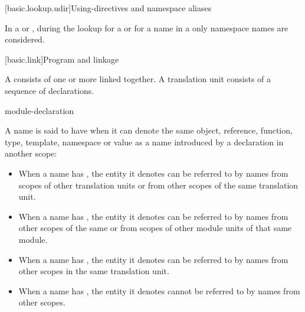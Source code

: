 [basic.lookup.udir]{Using-directives and namespace aliases}

\pnum
{}%
%
In a  or ,
during the lookup for a  or for a name in a
only namespace names are considered.%
%

[basic.link]{Program and linkage}%

\pnum
{}%
A  consists of one or more 
linked together. A translation unit consists
of a sequence of declarations.

\begin{bnf}
\br
    \br
     module-declaration  
\end{bnf}

\pnum
{}%
A name is said to have  when it can denote the same
object, reference, function, type, template, namespace or value as a
name introduced by a declaration in another scope:
\begin{itemize}
\item When a name has ,
the entity it denotes
can be referred to by names from scopes of other translation units or
from other scopes of the same translation unit.

\item When a name has ,
the entity it denotes
can be referred to by names from other scopes of the same  or
from scopes of other module units of that same module.

\item When a name has ,
the entity it denotes
can be referred to by names from other scopes in the same translation
unit.

\item When a name has , the entity it denotes
cannot be referred to by names from other scopes.
\end{itemize}

